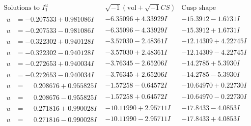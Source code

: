 \documentclass[1p]{elsarticle_modified}
\theoremstyle{definition}
\newcommand{\I}{\sqrt{-1}}
\begin{document}
$$\begin{array}{c|c|c}  
\text{Solutions to }I^u_{1}& \I (\text{vol} + \sqrt{-1}CS) & \text{Cusp shape}\\
 \hline 
\begin{aligned}
u &= -0.207533 + 0.981086 I\end{aligned}
 & -6.35096 + 4.33929 I & -15.3912 - 1.6731 I \\ \hline\begin{aligned}
u &= -0.207533 - 0.981086 I\end{aligned}
 & -6.35096 - 4.33929 I & -15.3912 + 1.6731 I \\ \hline\begin{aligned}
u &= -0.322302 + 0.940128 I\end{aligned}
 & -3.57030 - 2.48361 I & -12.14309 + 4.22745 I \\ \hline\begin{aligned}
u &= -0.322302 - 0.940128 I\end{aligned}
 & -3.57030 + 2.48361 I & -12.14309 - 4.22745 I \\ \hline\begin{aligned}
u &= -0.272653 + 0.940034 I\end{aligned}
 & -3.76345 - 2.65206 I & -14.2785 + 5.3930 I \\ \hline\begin{aligned}
u &= -0.272653 - 0.940034 I\end{aligned}
 & -3.76345 + 2.65206 I & -14.2785 - 5.3930 I \\ \hline\begin{aligned}
u &= \phantom{-}0.208676 + 0.955825 I\end{aligned}
 & -1.57258 - 0.64572 I & -10.64970 + 0.22730 I \\ \hline\begin{aligned}
u &= \phantom{-}0.208676 - 0.955825 I\end{aligned}
 & -1.57258 + 0.64572 I & -10.64970 - 0.22730 I \\ \hline\begin{aligned}
u &= \phantom{-}0.271816 + 0.990028 I\end{aligned}
 & -10.11990 + 2.95711 I & -17.8433 - 4.0853 I \\ \hline\begin{aligned}
u &= \phantom{-}0.271816 - 0.990028 I\end{aligned}
 & -10.11990 - 2.95711 I & -17.8433 + 4.0853 I \\ \hline\begin{aligned}

\end{aligned}
\end{array}$$
\end{document}
